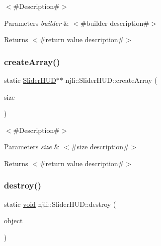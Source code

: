 $<$\#\+Description\#$>$


\begin{DoxyParams}{Parameters}
{\em builder} & $<$\#builder description\#$>$\\
\hline
\end{DoxyParams}
\begin{DoxyReturn}{Returns}
$<$\#return value description\#$>$ 
\end{DoxyReturn}
\mbox{\label{classnjli_1_1_slider_h_u_d_a7c2239129d284b67553d0c6535eaed1b}} 
\subsubsection{\texorpdfstring{create\+Array()}{createArray()}}
{\footnotesize\ttfamily static \mbox{\hyperlink{classnjli_1_1_slider_h_u_d}{Slider\+H\+UD}}$\ast$$\ast$ njli\+::\+Slider\+H\+U\+D\+::create\+Array (\begin{DoxyParamCaption}\item[{const \mbox{\hyperlink{_util_8h_a10e94b422ef0c20dcdec20d31a1f5049}{u32}}}]{size }\end{DoxyParamCaption})\hspace{0.3cm}{\ttfamily [static]}}

$<$\#\+Description\#$>$


\begin{DoxyParams}{Parameters}
{\em size} & $<$\#size description\#$>$\\
\hline
\end{DoxyParams}
\begin{DoxyReturn}{Returns}
$<$\#return value description\#$>$ 
\end{DoxyReturn}
\mbox{\label{classnjli_1_1_slider_h_u_d_a0d32698c697432a157e24ac11337f35b}} 
\subsubsection{\texorpdfstring{destroy()}{destroy()}}
{\footnotesize\ttfamily static \mbox{\hyperlink{_thread_8h_af1e856da2e658414cb2456cb6f7ebc66}{void}} njli\+::\+Slider\+H\+U\+D\+::destroy (\begin{DoxyParamCaption}\item[{\mbox{\hyperlink{classnjli_1_1_slider_h_u_d}{Slider\+H\+UD}} $\ast$}]{object }\end{DoxyParamCaption})\hspace{0.3cm}{\ttfamily [static]}}

